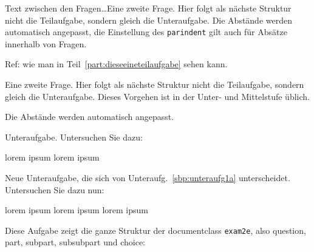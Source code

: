\documentclass[a4paper,12pt]{article}
\begin{document}
Text zwischen den Fragen\ldots Eine zweite Frage. Hier folgt als nächste Struktur nicht die Teilaufgabe, sondern gleich die Unteraufgabe. Die Abstände werden automatisch angepasst, die Einstellung des \texttt{parindent} gilt auch für Absätze innerhalb von Fragen.

Ref: wie man in Teil~\ref{part:dieseeineteilaufgabe} sehen kann.


\question%
Eine zweite Frage. Hier folgt als nächste Struktur nicht die Teilaufgabe, sondern gleich die Unteraufgabe. Dieses Vorgehen ist in der Unter- und Mittelstufe üblich.

Die Abstände werden automatisch angepasst.
\begin{subparts}
		\subpart\label{sbp:unteraufg1a} Unteraufgabe. Untersuchen Sie  dazu:
	\begin{subsubparts}
		\subsubpart lorem ipsum
		\subsubpart lorem ipsum
	\end{subsubparts}
		\subpart Neue Unteraufgabe, die sich von Unteraufg.~\ref{sbp:unteraufg1a} unterscheidet. Untersuchen Sie dazu nun:
	\begin{subsubparts}
		\subsubpart lorem ipsum
		\subsubpart lorem ipsum
		\subsubpart lorem ipsum
	\end{subsubparts}
\end{subparts}
\omitsolution



\question%
	Diese Aufgabe zeigt die ganze Struktur der documentclass \texttt{exam2e}, also question, part, subpart, subsubpart und choice:
\omitsolution
\end{document}
